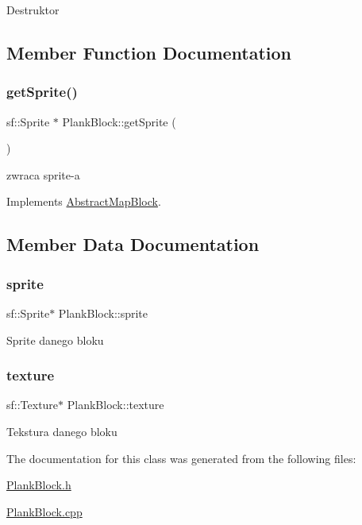 Destruktor 

\subsection{Member Function Documentation}
\mbox{\label{class_plank_block_abada589bb200fd82fcfe00482ad6a32f}} 
\subsubsection{\texorpdfstring{get\+Sprite()}{getSprite()}}
{\footnotesize\ttfamily sf\+::\+Sprite $\ast$ Plank\+Block\+::get\+Sprite (\begin{DoxyParamCaption}{ }\end{DoxyParamCaption})\hspace{0.3cm}{\ttfamily [virtual]}}

zwraca sprite-\/a 

Implements \hyperlink{class_abstract_map_block_ab5a448a1b6478d10a8814c6d19c4fdb4}{Abstract\+Map\+Block}.



\subsection{Member Data Documentation}
\mbox{\label{class_plank_block_a28e42e2ccc8973b39b3c1fbdeee78c36}} 
\subsubsection{\texorpdfstring{sprite}{sprite}}
{\footnotesize\ttfamily sf\+::\+Sprite$\ast$ Plank\+Block\+::sprite\hspace{0.3cm}{\ttfamily [protected]}}

Sprite danego bloku \mbox{\label{class_plank_block_a9b6bada075fecb031e3db24eff50fd19}} 
\subsubsection{\texorpdfstring{texture}{texture}}
{\footnotesize\ttfamily sf\+::\+Texture$\ast$ Plank\+Block\+::texture\hspace{0.3cm}{\ttfamily [protected]}}

Tekstura danego bloku 

The documentation for this class was generated from the following files\+:\begin{DoxyCompactItemize}
\item 
\hyperlink{_plank_block_8h}{Plank\+Block.\+h}\item 
\hyperlink{_plank_block_8cpp}{Plank\+Block.\+cpp}\end{DoxyCompactItemize}
